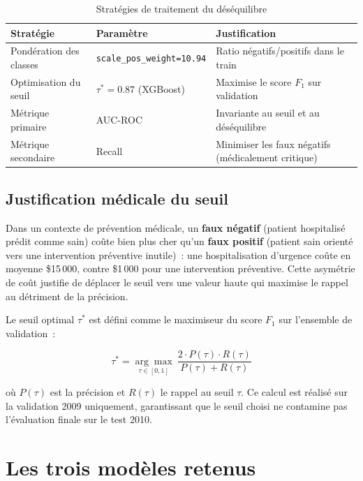 \begin{table}[htbp]
\centering
\caption{Stratégies de traitement du déséquilibre}
\label{tab:desequilibre}
\begin{tabular}{@{}llp{6cm}@{}}
\toprule
\textbf{Stratégie} & \textbf{Paramètre} & \textbf{Justification} \\
\midrule
Pondération des classes  & \texttt{scale\_pos\_weight=10.94}
  & Ratio négatifs/positifs dans le train \\
Optimisation du seuil    & $\tau^* = 0.87$ (XGBoost)
  & Maximise le score $F_1$ sur validation \\
Métrique primaire        & AUC-ROC
  & Invariante au seuil et au déséquilibre \\
Métrique secondaire      & Recall
  & Minimiser les faux négatifs (médicalement critique) \\
\bottomrule
\end{tabular}
\end{table}

\subsection{Justification médicale du seuil}

Dans un contexte de prévention médicale, un \textbf{faux négatif} (patient
hospitalisé prédit comme sain) coûte bien plus cher qu'un \textbf{faux positif}
(patient sain orienté vers une intervention préventive inutile)~: une hospitalisation
d'urgence coûte en moyenne \$15\,000, contre \$1\,000 pour une intervention préventive.
Cette asymétrie de coût justifie de déplacer le seuil vers une valeur haute qui maximise
le rappel au détriment de la précision.

Le seuil optimal $\tau^*$ est défini comme le maximiseur du score $F_1$ sur
l'ensemble de validation~:

\begin{equation}
\label{eq:seuil}
\tau^* = \underset{\tau \in [0,1]}{\arg\max}~
\frac{2 \cdot P(\tau) \cdot R(\tau)}{P(\tau) + R(\tau)}
\end{equation}

\noindent où $P(\tau)$ est la précision et $R(\tau)$ le rappel au seuil $\tau$.
Ce calcul est réalisé sur la validation 2009 uniquement, garantissant que le seuil
choisi ne contamine pas l'évaluation finale sur le test 2010.


\section{Les trois modèles retenus}

